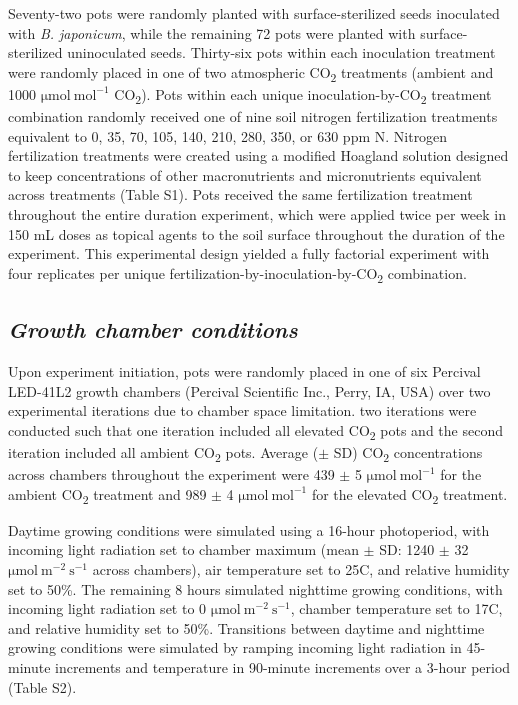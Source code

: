     Seventy-two pots were randomly planted with surface-sterilized seeds inoculated with \textit{B. japonicum}, while the remaining 72 pots were planted with surface-sterilized uninoculated seeds. Thirty-six pots within each inoculation treatment were randomly placed in one of two atmospheric CO\textsubscript{2} treatments (ambient and 1000 $\mathrm{\mu mol\ mol^{-1}}$ CO\textsubscript{2}). Pots within each unique inoculation-by-CO\textsubscript{2} treatment combination randomly received one of nine soil nitrogen fertilization treatments equivalent to 0, 35, 70, 105, 140, 210, 280, 350, or 630 ppm N. Nitrogen fertilization treatments were created using a modified Hoagland solution  designed to keep concentrations of other macronutrients and micronutrients equivalent across treatments (Table S1). Pots received the same fertilization treatment throughout the entire duration experiment, which were applied twice per week in 150 mL doses as topical agents to the soil surface throughout the duration of the experiment. This experimental design yielded a fully factorial experiment with four replicates per unique fertilization-by-inoculation-by-CO\textsubscript{2} combination.

    \subsection{\textit{Growth chamber conditions}}

    Upon experiment initiation, pots were randomly placed in one of six Percival LED-41L2 growth chambers (Percival Scientific Inc., Perry, IA, USA) over two experimental iterations due to chamber space limitation. two iterations were conducted such that one iteration included all elevated CO\textsubscript{2} pots and the second iteration included all ambient CO\textsubscript{2} pots. Average ($\pm$ SD) CO\textsubscript{2} concentrations across chambers throughout the experiment were 439 $\pm$ 5 $\mathrm{\mu mol\ mol^{-1}}$ for the ambient CO\textsubscript{2} treatment and 989 $\pm$ 4 $\mathrm{\mu mol\ mol^{-1}}$ for the elevated CO\textsubscript{2} treatment.
    
    Daytime growing conditions were simulated using a 16-hour photoperiod, with incoming light radiation set to chamber maximum (mean $\pm$ SD: 1240 $\pm$ 32 $\mathrm{\mu mol\ m^{-2}\ s^{-1}}$ across chambers), air temperature set to 25\textdegree{}C, and relative humidity set to 50\%. The remaining 8 hours simulated nighttime growing conditions, with incoming light radiation set to 0 $\mathrm{\mu mol\ m^{-2}\ s^{-1}}$, chamber temperature set to 17\textdegree{}C, and relative humidity set to 50\%. Transitions between daytime and nighttime growing conditions were simulated by ramping incoming light radiation in 45-minute increments and temperature in 90-minute increments over a 3-hour period (Table S2).
    
